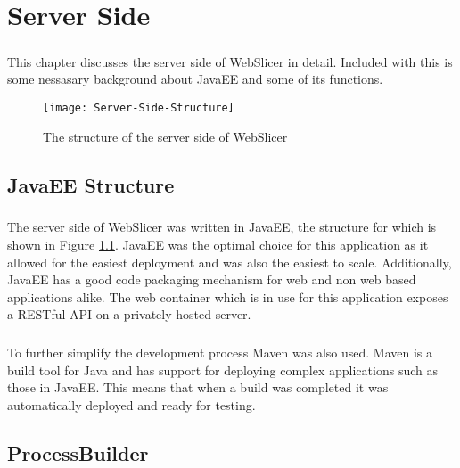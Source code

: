 \chapter{Server Side}
\paragraph{}
This chapter discusses the server side of WebSlicer in detail. 
Included with this is some nessasary background about JavaEE and some of its functions.

\begin{figure}[!ht]
  \centering
  \texttt{[image: Server-Side-Structure]}
  \caption{The structure of the server side of WebSlicer}
  \label{fig:server-side-structure}
\end{figure}

\section{JavaEE Structure}
\paragraph{}
The server side of WebSlicer was written in JavaEE, the structure for which is shown in Figure \ref{fig:server-side-structure}.
JavaEE was the optimal choice for this application as it allowed for the easiest deployment and was also the easiest to scale.
Additionally, JavaEE has a good code packaging mechanism for web and non web based applications alike.
The web container which is in use for this application exposes a RESTful API on a privately hosted server.

\paragraph{}
To further simplify the development process Maven was also used.
Maven is a build tool for Java and has support for deploying complex applications such as those in JavaEE.
This means that when a build was completed it was automatically deployed and ready for testing.

\section{ProcessBuilder}
